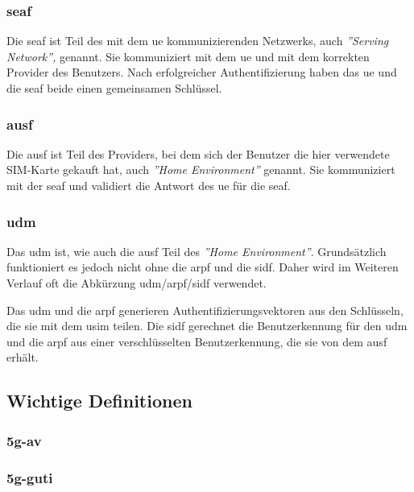 \subsubsection{\gls{seaf}}

Die \gls{seaf} ist Teil des mit dem \gls{ue} kommunizierenden Netzwerks, auch \textit{''Serving Network''‚} genannt.
Sie kommuniziert mit dem \gls{ue} und mit dem korrekten Provider des Benutzers.
Nach erfolgreicher Authentifizierung haben das \gls{ue} und die \gls{seaf} beide einen gemeinsamen Schl\"ussel.%

\subsubsection{\gls{ausf}}

Die \gls{ausf} ist Teil des Providers, bei dem sich der Benutzer die hier verwendete SIM-Karte gekauft hat, auch \textit{''Home Environment''} genannt.
Sie kommuniziert mit der \gls{seaf} und validiert die Antwort des \gls{ue} f\"ur die \gls{seaf}.

\subsubsection{\gls{udm}}

Das \gls{udm} ist, wie auch die \gls{ausf} Teil des \textit{''Home Environment''}.
Grunds\"atzlich funktioniert es jedoch nicht ohne die \gls{arpf} und die \gls{sidf}.
Daher wird im Weiteren Verlauf oft die Abk\"urzung \gls{udm}/\gls{arpf}/\gls{sidf} verwendet.

Das \gls{udm} und die \gls{arpf} generieren Authentifizierungsvektoren aus den Schl\"usseln, die sie mit dem \gls{usim} teilen.
Die \gls{sidf} gerechnet die Benutzerkennung f\"ur den \gls{udm} und die \gls{arpf} aus einer verschl\"usselten Benutzerkennung, die sie von dem \gls{ausf} erh\"alt.


\subsection{Wichtige Definitionen}

\subsubsection{\gls{5g-av}}

\subsubsection{\gls{5g-guti}}

